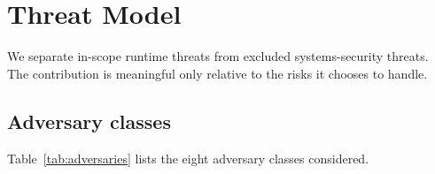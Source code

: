 \documentclass[sn-mathphys-num]{sn-jnl}
\begin{document}
\section{Threat Model}\label{sec:threat}

We separate in-scope runtime threats from excluded systems-security threats.
The contribution is meaningful only relative to the risks it chooses to
handle.

\subsection{Adversary classes}\label{sec:adversaries}

Table~\ref{tab:adversaries} lists the eight adversary classes considered.
\end{document}
